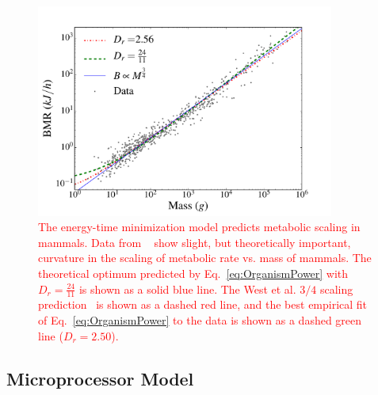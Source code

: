 \documentclass[12pt]{article}
\newcommand{\red}[1]{\textcolor{red}{#1}}
\begin{document}
 
\begin{figure}[!h] \centering
  \includegraphics[height=70mm]{Figures/OrganismsPowerScalingv2.pdf}

  \caption{\red{The energy-time minimization model predicts metabolic
    scaling in mammals. Data from ~\cite{kolokotrones2010curvature}
    show slight, but theoretically important, curvature in the scaling of metabolic rate vs. mass of mammals.  The  theoretical optimum predicted by Eq.~\ref{eq:OrganismPower}
    with $D_r = \frac{24}{11}$ is shown as a solid blue line. The West et
    al. $3/4$ scaling prediction~\cite{west97} is shown as a dashed red line, and the best empirical fit of Eq.~\ref{eq:OrganismPower} to the data is
    shown as a dashed green line ($D_r = 2.50$).}}
\label{fig:OrganismsPowerScaling}
\end{figure}



\subsection{Microprocessor Model}
\label{sec:computers}
\end{document}
